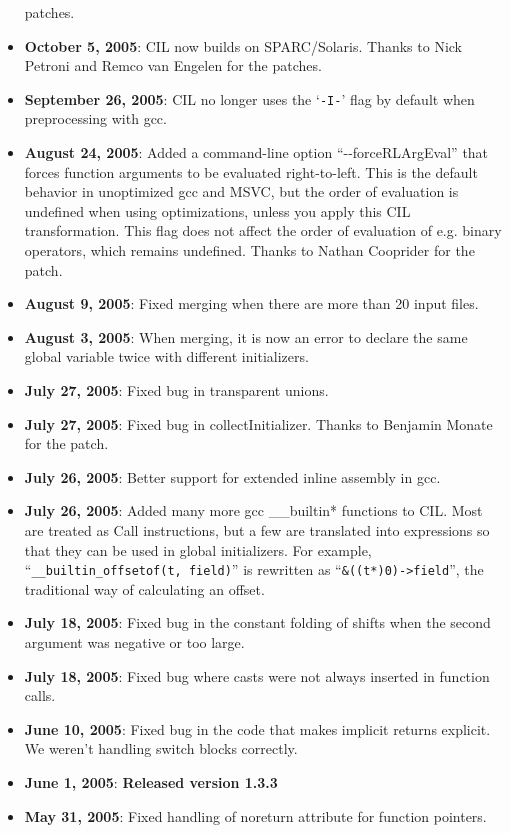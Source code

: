 \documentclass{article}
\def\t#1{{\tt #1}}
\begin{document}
\begin{itemize}
  patches.
\item {\bf October 5, 2005}: CIL now builds on SPARC/Solaris.  Thanks
  to Nick Petroni and Remco van Engelen for the patches.
\item {\bf September 26, 2005}: CIL no longer uses the `\t{-I-}' flag
  by default when preprocessing with gcc.
\item {\bf August 24, 2005}: Added a command-line option
  ``-{}-forceRLArgEval'' that forces function arguments to be evaluated
  right-to-left.  This is the default behavior in unoptimized gcc and
  MSVC, but the order of evaluation is undefined when using
  optimizations, unless you apply this CIL transformation.  This flag
  does not affect the order of evaluation of e.g. binary operators,
  which remains undefined.  Thanks to Nathan Cooprider for the patch.
\item {\bf August 9, 2005}: Fixed merging when there are more than 20
  input files.
\item {\bf August 3, 2005}: When merging, it is now an error to
  declare the same global variable twice with different initializers.
\item {\bf July 27, 2005}: Fixed bug in transparent unions.
\item {\bf July 27, 2005}: Fixed bug in collectInitializer.  Thanks to
  Benjamin Monate for the patch.
\item {\bf July 26, 2005}: Better support for extended inline assembly
  in gcc.
\item {\bf July 26, 2005}: Added many more gcc \_\_builtin* functions
  to CIL.  Most are treated as Call instructions, but a few are
  translated into expressions so that they can be used in global
  initializers.  For example, ``\t{\_\_builtin\_offsetof(t, field)}'' is
  rewritten as ``\t{\&((t*)0)->field}'', the traditional way of calculating
  an offset.
\item {\bf July 18, 2005}: Fixed bug in the constant folding of shifts
  when the second argument was negative or too large.
\item {\bf July 18, 2005}: Fixed bug where casts were not always
  inserted in function calls.
\item {\bf June 10, 2005}: Fixed bug in the code that makes implicit
  returns explicit.  We weren't handling switch blocks correctly.
\item {\bf June 1, 2005}: {\bf Released version 1.3.3}
\item {\bf May 31, 2005}: Fixed handling of noreturn attribute for function
  pointers. 

\end{itemize}
\end{document}
